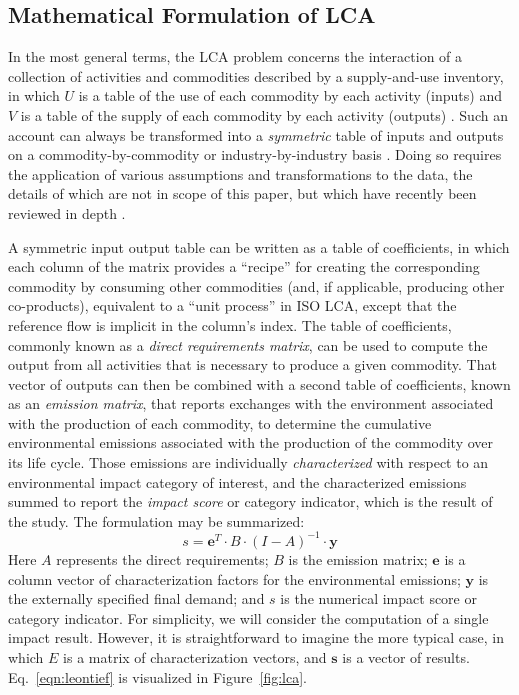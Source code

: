 \subsection{Mathematical Formulation of LCA}

In the most general terms, the LCA problem concerns the interaction of a collection of activities and commodities described by a supply-and-use inventory, in which $U$ is a table of the use of each commodity by each activity (inputs) and $V$ is a table of the supply of each commodity by each activity (outputs) \citep{Pauliuk_framework_2015}.  Such an account can always be transformed into a \textit{symmetric} table of inputs and outputs on a commodity-by-commodity or industry-by-industry basis \citep{Eurostat_2008}. Doing so requires the application of various assumptions and transformations to the data, the details of which are not in scope of this paper, but which have recently been reviewed in depth \citep{Suh_JIE_2010, Majeau_Bettez_2014}.  

A symmetric input output table can be written as a table of coefficients, in which each column of the matrix provides a ``recipe'' for creating the corresponding commodity by consuming other commodities (and, if applicable, producing other co-products), equivalent to a ``unit process'' in ISO LCA, except that the reference flow is implicit in the column's index.  The table of coefficients, commonly known as a \textit{direct requirements matrix}, can be used to compute the output from all activities that is necessary to produce a given commodity.  That vector of outputs can then be combined with a second table of coefficients, known as an \textit{emission matrix}, that reports exchanges with the environment associated with the production of each commodity, to determine the cumulative environmental emissions associated with the production of the commodity over its life cycle.  Those emissions are individually \textit{characterized} with respect to an environmental impact category of interest, and the characterized emissions summed to report the \textit{impact score} or category indicator, which is the result of the study.  The formulation may be summarized:
\begin{equation}
s = \mathbf{e}^T \cdot B \cdot \left(I - A\right)^{-1} \cdot \mathbf{y}
\label{eqn:leontief}
\end{equation}
Here $A$ represents the direct requirements; $B$ is the emission matrix;  $\mathbf{e}$ is a column vector of characterization factors for the environmental emissions; $\mathbf{y}$ is the externally specified final demand; and $s$ is the numerical impact score or category indicator.  For simplicity, we will consider the computation of a single impact result.  However, it is straightforward to imagine the more typical case, in which $E$ is a matrix of characterization vectors, and $\mathbf{s}$ is a vector of results.  Eq.~\ref{eqn:leontief} is visualized in Figure~\ref{fig:lca}.


